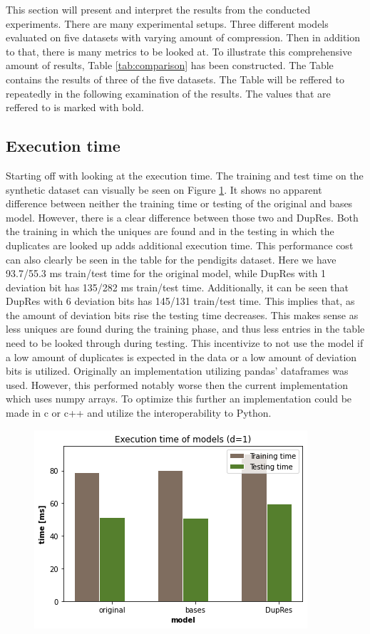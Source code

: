 This section will present and interpret the results from the conducted experiments. There are many experimental setups. Three different models evaluated on five datasets with varying amount of compression. Then in addition to that, there is many metrics to be looked at. To illustrate this comprehensive amount of results, Table \ref{tab:comparison} has been constructed. The Table contains the results of three of the five datasets. The Table will be reffered to repeatedly in the following examination of the results. The values that are reffered to is marked with bold.

\subsection{Execution time}
Starting off with looking at the execution time. The training and test time on the synthetic dataset can visually be seen on Figure \ref{fig:performance_time}. It shows no apparent difference between neither the training time or testing of the original and bases model. However, there is a clear difference between those two and DupRes. Both the training in which the uniques are found and in the testing in which the duplicates are looked up adds additional execution time. This performance cost can also clearly be seen in the table for the pendigits dataset. Here we have 93.7/55.3 ms train/test time for the original model, while DupRes with 1 deviation bit has 135/282 ms train/test time. Additionally, it can be seen that DupRes with 6 deviation bits has 145/131 train/test time. This implies that, as the amount of deviation bits rise the testing time decreases. This makes sense as less uniques are found during the training phase, and thus less entries in the table need to be looked through during testing. This incentivize to not use the model if a low amount of duplicates is expected in the data or a low amount of deviation bits is utilized. Originally an implementation utilizing pandas'\cite{pandas} dataframes was used. However, this performed notably worse then the current implementation which uses numpy\cite{numpy} arrays. To optimize this further an implementation could be made in c or c++ and utilize the interoperability to Python.

\begin{figure}
  \centering
  \includegraphics[width=0.8\linewidth]{images/performance_time.png}
  \caption{}
  \label{fig:performance_time}
\end{figure}

